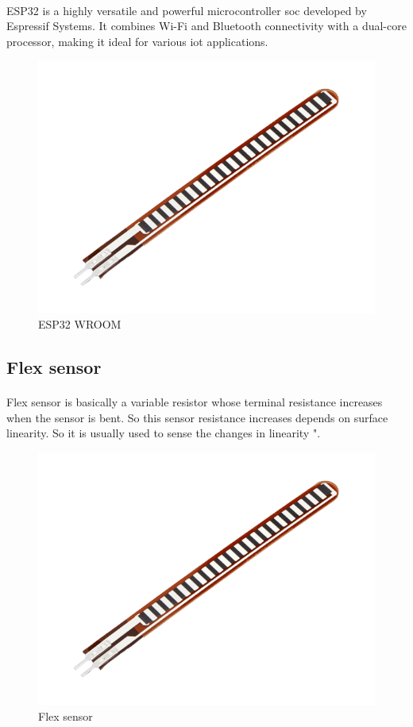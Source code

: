\paragraph{}
ESP32 is a highly versatile and powerful microcontroller \ac{soc} developed by Espressif Systems. It combines Wi-Fi and Bluetooth connectivity with a dual-core processor, making it ideal for various \ac{iot} applications.
\begin{figure}[h]
	\centering
	\includegraphics[width=0.5\linewidth]{images/flex-sensor}
	\caption{ESP32 WROOM}
	\label{fig:esp32}
\end{figure}
\subsection{Flex sensor}
\paragraph{}
Flex sensor is basically a variable resistor whose terminal resistance increases when the sensor is bent. So this sensor resistance increases depends on surface linearity. So it is usually used to sense the changes in linearity "\cite{flex}.
\begin{figure}[h]
	\centering
	\includegraphics[width=0.5\linewidth]{images/flex-sensor}
	\caption{Flex sensor}
	\label{fig:flex-sensor}
\end{figure}
